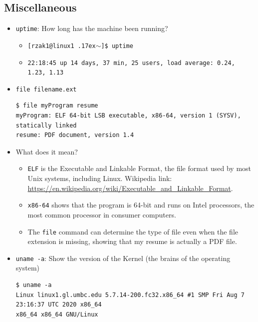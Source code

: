 \documentclass[letter,11pt]{article}
\begin{document}
\FloatBarrier
\subsection{Miscellaneous}
\begin{itemize}
    \item \texttt{uptime}: How long has the machine been running?
    \begin{itemize}
        \item \texttt{[rzak1@linux1 {\raise.17ex\hbox{$\scriptstyle\sim$}}]\$ uptime}
        \item \texttt{22:18:45 up 14 days, 37 min, 25 users,  load average: 0.24, 1.23, 1.13}
    \end{itemize}
    \item \texttt{file filename.ext}
    \begin{verbatim}
$ file myProgram resume
myProgram: ELF 64-bit LSB executable, x86-64, version 1 (SYSV), statically linked
resume: PDF document, version 1.4\end{verbatim}
    \item What does it mean?
    \begin{itemize}
        \item \texttt{ELF} is the Executable and Linkable Format, the file format used by most Unix systems, including Linux. Wikipedia link: \url{https://en.wikipedia.org/wiki/Executable\_and\_Linkable\_Format}.
        \item \texttt{x86-64} shows that the program is 64-bit and runs on Intel processors, the most common processor in consumer computers.
        \item The \texttt{file} command can determine the type of file even when the file extension is missing, showing that my resume is actually a PDF file.
    \end{itemize}
    \item \texttt{uname -a}: Show the version of the Kernel (the brains of the operating system)
    \begin{verbatim}
$ uname -a
Linux linux1.gl.umbc.edu 5.7.14-200.fc32.x86_64 #1 SMP Fri Aug 7 23:16:37 UTC 2020 x86_64
x86_64 x86_64 GNU/Linux\end{verbatim}
\end{itemize}
\end{document}
